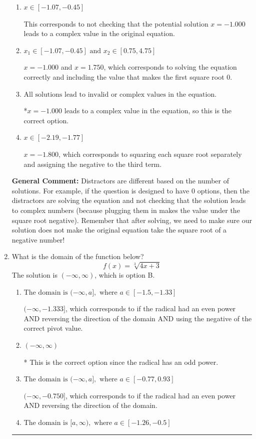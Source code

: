 \documentclass{extbook}[14pt]
\newcommand{\litem}[1]{\item #1

\rule{\textwidth}{0.4pt}}
\begin{document}
\begin{enumerate}
{\begin{enumerate}[label=\Alph*.]
$x = 0.222$ and $x = 1.750$, which corresponds to solving each radical separately for 0.
\item \( x \in [-1.07,-0.45] \)

This corresponds to not checking that the potential solution $x = -1.000$ leads to a complex value in the original equation.
\item \( x_1 \in [-1.07, -0.45] \text{ and } x_2 \in [0.75,4.75] \)

$x = -1.000$ and $x = 1.750$, which corresponds to solving the equation correctly and including the value that makes the first square root 0.
\item \( \text{All solutions lead to invalid or complex values in the equation.} \)

*$x = -1.000$ leads to a complex value in the equation, so this is the correct option.
\item \( x \in [-2.19,-1.77] \)

$x = -1.800$, which corresponds to squaring each square root separately and assigning the negative to the third term.
\end{enumerate}

\textbf{General Comment:} Distractors are different based on the number of solutions. For example, if the question is designed to have 0 options, then the distractors are solving the equation and not checking that the solution leads to complex numbers (because plugging them in makes the value under the square root negative). Remember that after solving, we need to make sure our solution does not make the original equation take the square root of a negative number!
}
\litem{
What is the domain of the function below?
\[ f(x) = \sqrt[3]{4 x + 3} \]The solution is \( (-\infty, \infty) \), which is option B.\begin{enumerate}[label=\Alph*.]
\item \( \text{The domain is } (-\infty, a], \text{   where } a \in [-1.5, -1.33] \)

$(-\infty, -1.333]$, which corresponds to if the radical had an even power AND reversing the direction of the domain AND using the negative of the correct pivot value.
\item \( (-\infty, \infty) \)

* This is the correct option since the radical has an odd power.
\item \( \text{The domain is } (-\infty, a], \text{   where } a \in [-0.77, 0.93] \)

$(-\infty, -0.750]$, which corresponds to if the radical had an even power AND reversing the direction of the domain.
\item \( \text{The domain is } [a, \infty), \text{   where } a \in [-1.26, -0.5] \)


\end{enumerate}}
\end{enumerate}
\end{document}
